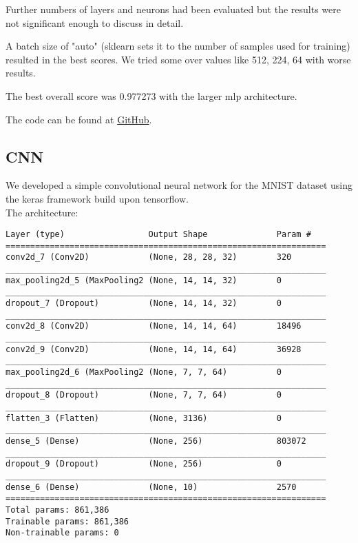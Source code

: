 \documentclass[a4paper, 11pt]{article}
\begin{document}
Further numbers of layers and neurons had been evaluated but the results were not significant enough to discuss in detail.

A batch size of "auto" (sklearn sets it to the number of samples used for training) resulted in the best scores.
We tried some over values like 512, 224, 64 with worse results.

The best overall score was 0.977273 with the larger mlp architecture.

The code can be found at \href{https://github.com/Flova/DAIS/blob/master//%C3%9Cbung 4/MNIST.ipynb}{GitHub}.

\subsection{CNN}

We developed a simple convolutional neural network for the MNIST dataset using the keras framework build upon tensorflow.\\

The architecture:

\begin{verbatim}
Layer (type)                 Output Shape              Param #
=================================================================
conv2d_7 (Conv2D)            (None, 28, 28, 32)        320
_________________________________________________________________
max_pooling2d_5 (MaxPooling2 (None, 14, 14, 32)        0
_________________________________________________________________
dropout_7 (Dropout)          (None, 14, 14, 32)        0
_________________________________________________________________
conv2d_8 (Conv2D)            (None, 14, 14, 64)        18496
_________________________________________________________________
conv2d_9 (Conv2D)            (None, 14, 14, 64)        36928
_________________________________________________________________
max_pooling2d_6 (MaxPooling2 (None, 7, 7, 64)          0
_________________________________________________________________
dropout_8 (Dropout)          (None, 7, 7, 64)          0
_________________________________________________________________
flatten_3 (Flatten)          (None, 3136)              0
_________________________________________________________________
dense_5 (Dense)              (None, 256)               803072
_________________________________________________________________
dropout_9 (Dropout)          (None, 256)               0
_________________________________________________________________
dense_6 (Dense)              (None, 10)                2570
=================================================================
Total params: 861,386
Trainable params: 861,386
Non-trainable params: 0
\end{verbatim}
\end{document}
